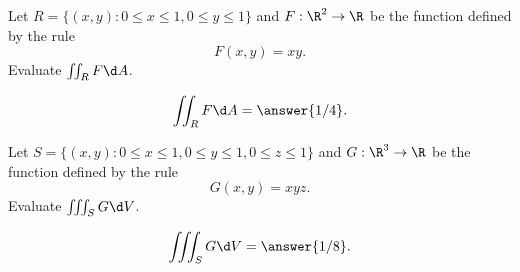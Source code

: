 \documentclass{ximera}
\author{Jim Fowler}
\begin{document}
\begin{exercise}
  Let $R=\{(x,y):0\le x\le 1, 0\le y\le 1\}$ and $F : \R^2 \to \R$ be
  the function defined by the rule
  \[
    F(x,y) = xy.
  \]
  Evaluate $\iint_R F \d A$.
  
  \begin{prompt}
    \[
      \iint_R F \d A = \answer{1/4}.
    \]
  \end{prompt}
\end{exercise}

\begin{exercise}
  Let $S=\{(x,y):0\le x\le 1, 0\le y\le 1, 0\le z\le 1\}$ and $G :
  \R^3 \to \R$ be the function defined by the rule
  \[
    G(x,y) = xyz.
  \]
  Evaluate $\iiint_S G \d V$.
  
  \begin{prompt}
    \[
      \iiint_S G \d V = \answer{1/8}.
    \]
  \end{prompt}

\end{exercise}
\end{document}
